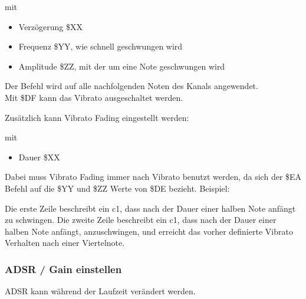 mit

\begin{itemize}
	\item Verzögerung \$XX
	\item Frequenz  \$YY, wie schnell geschwungen wird
	\item Amplitude \$ZZ, mit der um eine Note geschwungen wird
\end{itemize}

Der Befehl wird auf alle nachfolgenden Noten des Kanals angewendet. \\
Mit \$DF kann das Vibrato ausgeschaltet werden.

\bigskip

Zusätzlich kann Vibrato Fading eingestellt werden:

\medskip



\medskip

mit

\begin{itemize}
	\item Dauer \$XX
\end{itemize}

Dabei muss Vibrato Fading immer nach Vibrato benutzt werden, da sich der \$EA Befehl auf die \$YY und \$ZZ Werte von \$DE bezieht. Beispiel:

\medskip



\medskip

Die erste Zeile beschreibt ein c1, dass nach der Dauer einer halben Note anfängt zu schwingen.
Die zweite Zeile beschreibt ein c1, dass nach der Dauer einer halben Note anfängt, anzuschwingen,
und erreicht das vorher definierte Vibrato Verhalten nach einer Viertelnote.


\subsubsection{ADSR / Gain einstellen}

ADSR kann während der Laufzeit verändert werden.

\medskip



